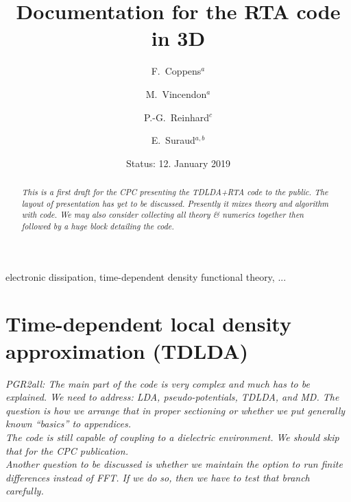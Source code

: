 \documentclass[final,1p]{elsarticle}
\newcommand{\PGR}[1]{{\color{blue} #1}}
\newcommand{\PGRcomm}[1]{{\color{blue}\small\em PGR2all: #1}}
\begin{document}
\begin{frontmatter}

\title{Documentation for the RTA code in 3D}

\author{F.~Coppens$^a$}
\author{M.~Vincendon$^a$}
\author{P.-G.~Reinhard$^c$}
\author{E.~Suraud$^{a,b}$}
\address{$^a$Universit\'e de Toulouse; UPS; Laboratoire de Physique
             Th\'{e}orique, IRSAMC; F-31062 Toulouse Cedex, France}
\address{$^b$Laboratoire de Physique Th\'eorique, Universit\'e Paul
  Sabatier, CNRS, F-31062 Toulouse C\'edex, France}
\address{$^c$Institut f{\"u}r Theoretische Physik, Universit{\"a}t
  Erlangen, D-91058 Erlangen, Germany}

\date{Status: 12. January 2019}
\begin{abstract}
\PGR{\em This is a first draft for the CPC presenting the TDLDA+RTA code
  to the public. The layout of presentation has yet to be discussed.
Presently it mixes theory and algorithm with code. We may also
consider collecting all theory \& numerics together then followed by a
huge block detailing the code.}
\end{abstract}

\begin{keyword}
electronic dissipation, time-dependent
density functional theory, ...
\end{keyword}
\end{frontmatter}

\newpage



\section{Time-dependent local density approximation (TDLDA)}
\label{sec:TDLDA}

\PGRcomm{The main part of the code is very complex and much has to be
  explained. We need to address: LDA, pseudo-potentials, TDLDA, and
  MD. The question is how we arrange that in proper sectioning or
  whether we put generally known ``basics'' to appendices.
\\
The code is still capable of coupling to a dielectric
  environment. We should skip that for the CPC publication.
\\
Another question to be discussed is whether we maintain the option to
run finite differences instead of FFT. If we do so, then we have to
test that branch carefully.
}
\end{document}
